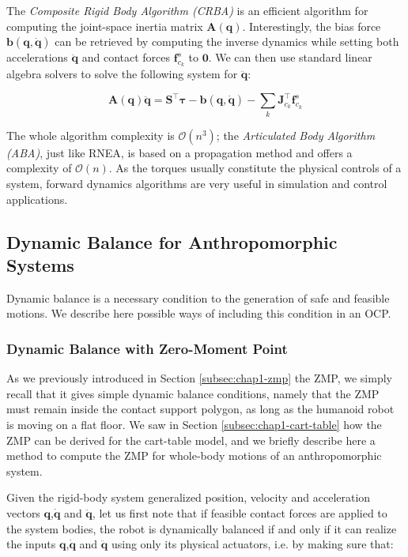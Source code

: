 The \emph{Composite Rigid Body Algorithm (CRBA)} is an efficient
algorithm for computing the joint-space inertia matrix
$\mathbf{A}(\mathbf{q})$. Interestingly, the bias force
$\mathbf{b}(\mathbf{q},\dot{\mathbf{q}})$ can be retrieved by computing the
inverse dynamics while setting both accelerations $\ddot{\mathbf{q}}$
and contact forces $\mathbf{f}^s_{c_k}$ to $\mathbf{0}$. We can then
use standard linear algebra solvers to solve the following system for
$\ddot{\mathbf{q}}$:

\begin{equation}
  \mathbf{A}(\mathbf{q})\ddot{\mathbf{q}} =
  \mathbf{S}^\top\boldsymbol{\tau} -
  \mathbf{b}(\mathbf{q},\dot{\mathbf{q}}) -
  \sum_k\mathbf{J}_{c_k}^\top\mathbf{f}^s_{c_k}
\end{equation}

The whole algorithm complexity is $\mathcal{O}(n^3)$; the
\emph{Articulated Body Algorithm (ABA)}, just like RNEA, is based on a
propagation method and offers a complexity of $\mathcal{O}(n)$. As the
torques usually constitute the physical controls of a system, forward
dynamics algorithms are very useful in simulation and control
applications.

\subsection{Dynamic Balance for Anthropomorphic Systems}

Dynamic balance is a necessary condition to the generation of safe and
feasible motions. We describe here possible ways of including this
condition in an OCP.

\subsubsection{Dynamic Balance with Zero-Moment Point}

As we previously introduced in Section \ref{subsec:chap1-zmp} the ZMP,
we simply recall that it gives simple dynamic balance conditions,
namely that the ZMP must remain inside the contact support polygon, as
long as the humanoid robot is moving on a flat floor. We saw in
Section \ref{subsec:chap1-cart-table} how the ZMP can be derived for
the cart-table model, and we briefly describe here a method to compute
the ZMP for whole-body motions of an anthropomorphic system.

Given the rigid-body system generalized position, velocity and
acceleration vectors $\mathbf{q}$,$\dot{\mathbf{q}}$ and
$\ddot{\mathbf{q}}$, let us first note that if feasible contact forces
are applied to the system bodies, the robot is dynamically balanced if
and only if it can realize the inputs $\mathbf{q}$,$\dot{\mathbf{q}}$
and $\ddot{\mathbf{q}}$ using only its physical actuators, i.e. by
making sure that:

